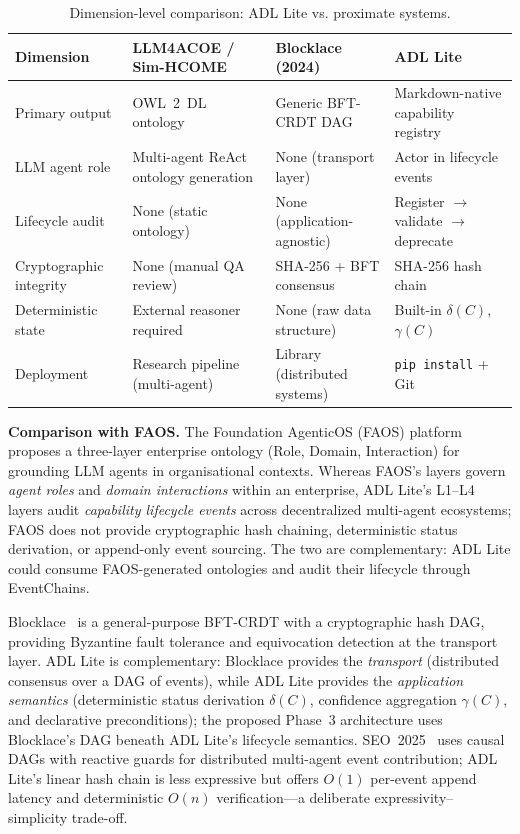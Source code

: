 \begin{table}[htbp]
\centering
\footnotesize
\caption{Dimension-level comparison: ADL Lite vs. proximate systems.}
\label{tab:llm-oe-comparison}
\begin{tabularx}{\textwidth}{@{}p{3.2cm}XXX@{}}
\toprule
\textbf{Dimension} & \textbf{LLM4ACOE / Sim-HCOME} & \textbf{Blocklace (2024)} & \textbf{ADL Lite} \\
\midrule
Primary output & OWL~2~DL ontology & Generic BFT-CRDT DAG & Markdown-native capability registry \\
LLM agent role & Multi-agent ReAct ontology generation & None (transport layer) & Actor in lifecycle events \\
Lifecycle audit & None (static ontology) & None (application-agnostic) & Register $\to$\allowbreak validate $\to$\allowbreak deprecate \\
Cryptographic integrity & None (manual QA review) & SHA-256 + BFT consensus & SHA-256 hash chain \\
Deterministic state & External reasoner required & None (raw data structure) & Built-in $\delta(C)$, $\gamma(C)$ \\
Deployment & Research pipeline (multi-agent) & Library (distributed systems) & \texttt{pip install} + Git \\
\bottomrule
\end{tabularx}
\end{table}

\textbf{Comparison with FAOS.} The Foundation AgenticOS (FAOS) platform \cite{tuan2026ontology} proposes a three-layer enterprise ontology (Role, Domain, Interaction) for grounding LLM agents in organisational contexts. Whereas FAOS's layers govern \emph{agent roles} and \emph{domain interactions} within an enterprise, ADL Lite's L1--L4 layers audit \emph{capability lifecycle events} across decentralized multi-agent ecosystems; FAOS does not provide cryptographic hash chaining, deterministic status derivation, or append-only event sourcing. The two are complementary: ADL Lite could consume FAOS-generated ontologies and audit their lifecycle through EventChains.

Blocklace~\cite{blocklace2024} is a general-purpose BFT-CRDT with a cryptographic hash DAG, providing Byzantine fault tolerance and equivocation detection at the transport layer. ADL Lite is complementary: Blocklace provides the \emph{transport} (distributed consensus over a DAG of events), while ADL Lite provides the \emph{application semantics} (deterministic status derivation $\delta(C)$, confidence aggregation $\gamma(C)$, and declarative preconditions); the proposed Phase~3 architecture uses Blocklace's DAG beneath ADL Lite's lifecycle semantics. SEO~2025~\cite{boldachev2025seo} uses causal DAGs with reactive guards for distributed multi-agent event contribution; ADL Lite's linear hash chain is less expressive but offers $O(1)$ per-event append latency and deterministic $O(n)$ verification---a deliberate expressivity--simplicity trade-off.

